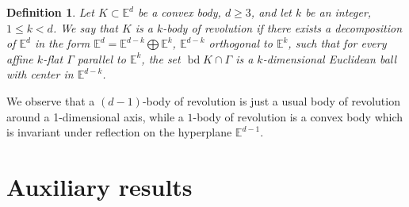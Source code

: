 \documentclass[12pt,thmsa]{amsart}
\newcommand{\Ed}{\mathbb{E}^{d}}
\newcommand{\bd}{\operatorname*{bd}}
\newtheorem{definition}{Definition}
\begin{document}
  
\begin{definition}\label{chupadota} 
Let $K\subset \mathbb{E}^{d}$ be a convex body, $d\geq 3$,  and let $k$ be an integer, $1\leq k<d$. We say that $K$ is a $k$-\textit{body of revolution} if there exists a decomposition of 
$\mathbb{E}^{d}$ in the form 
$\mathbb{E}^{d}=\mathbb{E}^{d-k} \bigoplus \mathbb{E}^{k}$, $\mathbb{E}^{d-k}$ orthogonal to 
$\mathbb{E}^{k}$, such that for every affine $k$-flat 
$\Gamma$ parallel to $\mathbb{E}^k$, the set $\bd K\cap \Gamma$ is a $k$-dimensional Euclidean ball with center in $\mathbb{E}^{d-k}$.
\end{definition} 



We observe that a $(d-1)$-body of revolution is just a usual body of revolution around a 1-dimensional axis, while a $1$-body of revolution is a convex body which is invariant under reflection on the hyperplane $\mathbb{E}^{d-1}$.  





\section{Auxiliary results}
\end{document}
